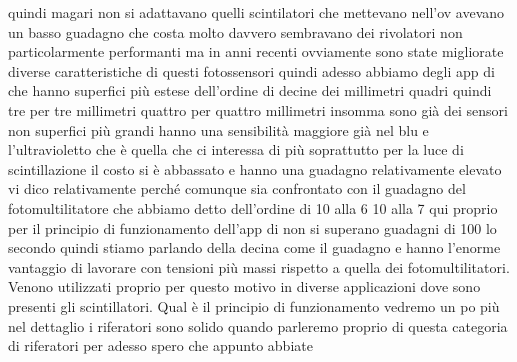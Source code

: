 quindi magari non si adattavano quelli scintilatori che mettevano nell'ov avevano un basso guadagno che costa molto davvero sembravano dei rivolatori non particolarmente performanti ma in anni recenti ovviamente sono state migliorate diverse caratteristiche di questi fotossensori quindi adesso abbiamo degli app di che hanno superfici più estese dell'ordine di decine dei millimetri quadri quindi tre per tre millimetri quattro per quattro millimetri insomma sono già dei sensori non superfici più grandi hanno una sensibilità maggiore già nel blu e l'ultravioletto che è quella che ci interessa di più soprattutto per la luce di scintillazione il costo si è abbassato e hanno una guadagno relativamente elevato vi dico relativamente perché comunque sia confrontato con il guadagno del fotomultilitatore che abbiamo detto dell'ordine di 10 alla 6 10 alla 7 qui proprio per il principio di funzionamento dell'app di non si superano guadagni di 100 lo secondo quindi stiamo parlando della decina come il guadagno e hanno l'enorme vantaggio di lavorare con tensioni più massi rispetto a quella dei fotomultilitatori. Venono utilizzati proprio per questo motivo in diverse applicazioni dove sono presenti gli scintillatori. Qual è il principio di funzionamento vedremo un po più nel dettaglio i riferatori sono solido quando parleremo proprio di questa categoria di riferatori per adesso spero che appunto abbiate 


